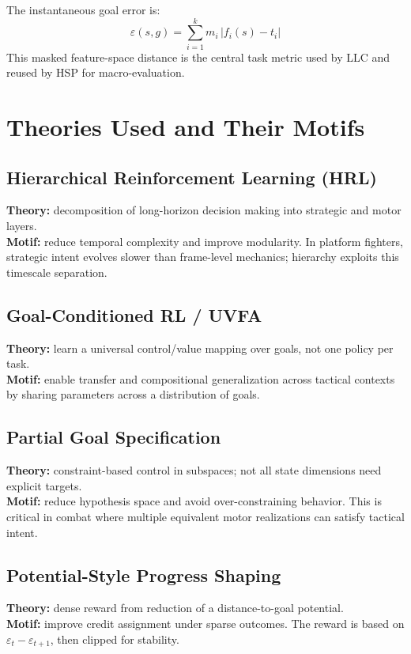 \documentclass[11pt,a4paper]{article}
\begin{document}
The instantaneous goal error is:
\[
\varepsilon(s,g)=\sum_{i=1}^{k} m_i\,|f_i(s)-t_i|
\]
This masked feature-space distance is the central task metric used by LLC and reused by HSP for macro-evaluation.

\section{Theories Used and Their Motifs}
\subsection{Hierarchical Reinforcement Learning (HRL)}
\textbf{Theory:} decomposition of long-horizon decision making into strategic and motor layers.\\
\textbf{Motif:} reduce temporal complexity and improve modularity. In platform fighters, strategic intent evolves slower than frame-level mechanics; hierarchy exploits this timescale separation.

\subsection{Goal-Conditioned RL / UVFA}
\textbf{Theory:} learn a universal control/value mapping over goals, not one policy per task.\\
\textbf{Motif:} enable transfer and compositional generalization across tactical contexts by sharing parameters across a distribution of goals.

\subsection{Partial Goal Specification}
\textbf{Theory:} constraint-based control in subspaces; not all state dimensions need explicit targets.\\
\textbf{Motif:} reduce hypothesis space and avoid over-constraining behavior. This is critical in combat where multiple equivalent motor realizations can satisfy tactical intent.

\subsection{Potential-Style Progress Shaping}
\textbf{Theory:} dense reward from reduction of a distance-to-goal potential.\\
\textbf{Motif:} improve credit assignment under sparse outcomes. The reward is based on $\varepsilon_t-\varepsilon_{t+1}$, then clipped for stability.
\end{document}
